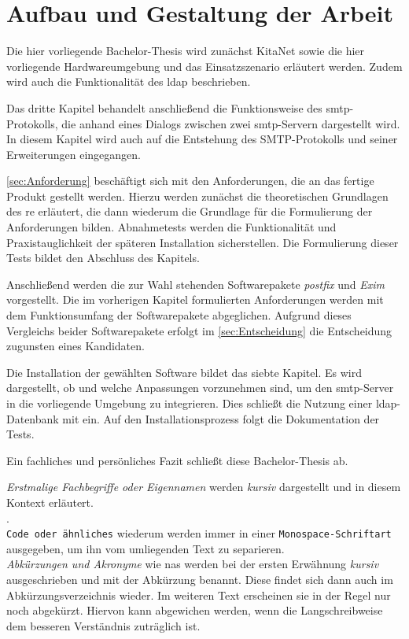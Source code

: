 \section{Aufbau und Gestaltung der Arbeit}

Die hier vorliegende Bachelor-Thesis wird zunächst KitaNet sowie die hier vorliegende Hardwareumgebung und das Einsatzszenario erläutert werden. 
Zudem wird auch die Funktionalität des \ac{ldap} beschrieben.

Das dritte Kapitel behandelt anschließend die Funktionsweise des \ac{smtp}-Protokolls, die anhand eines Dialogs zwischen zwei \ac{smtp}-Servern dargestellt wird. In diesem Kapitel wird auch auf die Entstehung des SMTP-Protokolls und seiner Erweiterungen eingegangen.

\autoref{sec:Anforderung} beschäftigt sich mit den Anforderungen, die an das fertige Produkt gestellt werden. Hierzu werden zunächst die theoretischen Grundlagen des \ac{re} erläutert, die dann wiederum die Grundlage für die Formulierung der Anforderungen bilden. Abnahmetests werden die Funktionalität und Praxistauglichkeit der späteren Installation sicherstellen. Die Formulierung dieser Tests bildet den Abschluss des Kapitels.

Anschließend werden die zur Wahl stehenden Softwarepakete \textit{postfix} und \textit{Exim} vorgestellt. Die im vorherigen Kapitel formulierten Anforderungen werden mit dem Funktionsumfang der Softwarepakete abgeglichen. Aufgrund dieses Vergleichs beider Softwarepakete erfolgt im \autoref{sec:Entscheidung} die Entscheidung zugunsten eines Kandidaten. 

Die Installation der gewählten Software bildet das siebte Kapitel. Es wird dargestellt, ob und welche Anpassungen vorzunehmen sind, um den \ac{smtp}-Server in die vorliegende Umgebung zu integrieren. Dies schließt die Nutzung einer \ac{ldap}-Datenbank mit ein. 
Auf den Installationsprozess folgt die Dokumentation der Tests.

Ein fachliches und persönliches Fazit schließt diese Bachelor-Thesis ab.

\textit{Erstmalige Fachbegriffe oder Eigennamen} werden \textit{kursiv} dargestellt und in diesem Kontext erläutert.  \\ 
.
\\ \verb+Code oder ähnliches+ wiederum werden immer in einer \verb+Monospace-Schriftart+ ausgegeben, um ihn vom umliegenden Text zu separieren. \\
\textit{Abkürzungen und Akronyme} wie \zb \acf{nas} werden bei der ersten Erwähnung \textit{kursiv} ausgeschrieben und mit der Abkürzung benannt. Diese findet sich dann auch im Abkürzungsverzeichnis wieder. Im weiteren Text erscheinen sie in der Regel nur noch abgekürzt. Hiervon kann abgewichen werden, wenn die Langschreibweise dem besseren Verständnis zuträglich ist.

